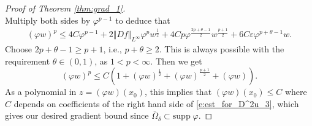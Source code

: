 \documentclass[12pt,reqno]{amsart}
\numberwithin{figure}{section}
\theoremstyle{plain}
\theoremstyle{remark}
\numberwithin{equation}{section}
\begin{document}
\begin{proof}[Proof of Theorem \ref{thm:grad_1}]
\begin{equation*}
\end{equation*}
Multiply both sides by $\varphi^{p-1}$ to deduce that
\begin{align*}
    (\varphi w)^p \leq 4C\varphi^{p-1} + 2\Vert Df\Vert_{L^\infty}\varphi^p w^{\frac{1}{2}} + 4Cp \varphi^{\frac{2p+\theta - 1}{2}}w^{\frac{p+1}{2}} + 6C\varepsilon \varphi^{p+\theta - 1}w.
\end{align*}
Choose $2p+\theta -1 \geq p+1$, i.e., $p+\theta\geq 2$. This is always possible with the requirement $\theta \in (0,1)$, as $1<p <\infty$. Then we get
\begin{equation}\label{e:est_for_D^2u_3}
    (\varphi w)^p \leq C\left(1+ (\varphi w)^\frac{1}{2} + (\varphi w)^\frac{p+1}{2} +(\varphi w)\right).
\end{equation}
As a polynomial in $z = (\varphi w)(x_0)$, this implies that $(\varphi w)(x_0)\leq C$ where $C$ depends on coefficients of the right hand side of \eqref{e:est_for_D^2u_3}, which gives our desired gradient bound since $\overline{\Omega}_\delta\subset \mathrm{supp}\;\varphi$.
\end{proof}
\end{document}
